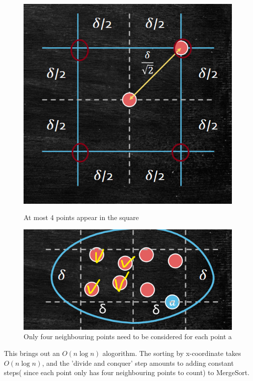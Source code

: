 \begin{figure}[htbp]
	\centering
	\begin{minipage}{0.3\linewidth}
		\centering
		\includegraphics[width=0.8\linewidth]{Notes/fig/fourPoints.png}
		\caption{At most 4 points appear in the square}
		\label{fig:fourPoints}%
	\end{minipage}
	\begin{minipage}{0.6\linewidth}
		\centering
		\includegraphics[width=0.8\linewidth]{Notes/fig/ClosestPair.png}
		\caption{Only four neighbouring points need to be considered for each point a}
		\label{fig:closestPair}%
	\end{minipage}
\end{figure}

This brings out an $O(n\log n)$ alogorithm. The sorting by x-coordinate takes $O(n\log n)$, and the 'divide and conquer' step amounts to adding constant steps( since each point only has four neighbouring points to count) to MergeSort.

